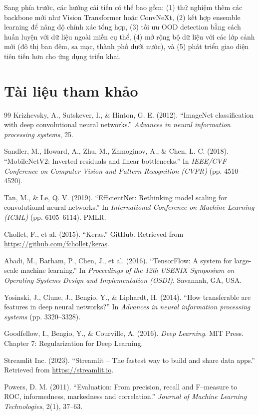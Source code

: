 \documentclass[12pt,a4paper]{article}
\begin{document}
Sang phía trước, các hướng cải tiến có thể bao gồm: (1) thử nghiệm thêm các backbone mới như Vision Transformer hoặc ConvNeXt, (2) kết hợp ensemble learning để nâng độ chính xác tổng hợp, (3) tối ưu OOD detection bằng cách huấn luyện với dữ liệu ngoài miền cụ thể, (4) mở rộng bộ dữ liệu với các lớp cảnh mới (đô thị ban đêm, sa mạc, thành phố dưới nước), và (5) phát triển giao diện tiên tiến hơn cho ứng dụng triển khai.

\section{Tài liệu tham khảo}

\begin{thebibliography}{99}
     Krizhevsky, A., Sutskever, I., \& Hinton, G. E. (2012). ``ImageNet classification with deep convolutional neural networks.'' \textit{Advances in neural information processing systems}, 25.
    
     Sandler, M., Howard, A., Zhu, M., Zhmoginov, A., \& Chen, L. C. (2018). ``MobileNetV2: Inverted residuals and linear bottlenecks.'' In \textit{IEEE/CVF Conference on Computer Vision and Pattern Recognition (CVPR)} (pp. 4510--4520).
    
     Tan, M., \& Le, Q. V. (2019). ``EfficientNet: Rethinking model scaling for convolutional neural networks.'' In \textit{International Conference on Machine Learning (ICML)} (pp. 6105--6114). PMLR.
    
     Chollet, F., et al. (2015). ``Keras.'' GitHub. Retrieved from \url{https://github.com/fchollet/keras}.
    
     Abadi, M., Barham, P., Chen, J., et al. (2016). ``TensorFlow: A system for large-scale machine learning.'' In \textit{Proceedings of the 12th USENIX Symposium on Operating Systems Design and Implementation (OSDI)}, Savannah, GA, USA.
    
     Yosinski, J., Clune, J., Bengio, Y., \& Liphardt, H. (2014). ``How transferable are features in deep neural networks?'' In \textit{Advances in neural information processing systems} (pp. 3320--3328). 
    
     Goodfellow, I., Bengio, Y., \& Courville, A. (2016). \textit{Deep Learning}. MIT Press. Chapter 7: Regularization for Deep Learning.
    
     Streamlit Inc. (2023). ``Streamlit -- The fastest way to build and share data apps.'' Retrieved from \url{https://streamlit.io}.
    
     Powers, D. M. (2011). ``Evaluation: From precision, recall and F--measure to ROC, informedness, markedness and correlation.'' \textit{Journal of Machine Learning Technologies}, 2(1), 37--63.
\end{thebibliography}
\end{document}
